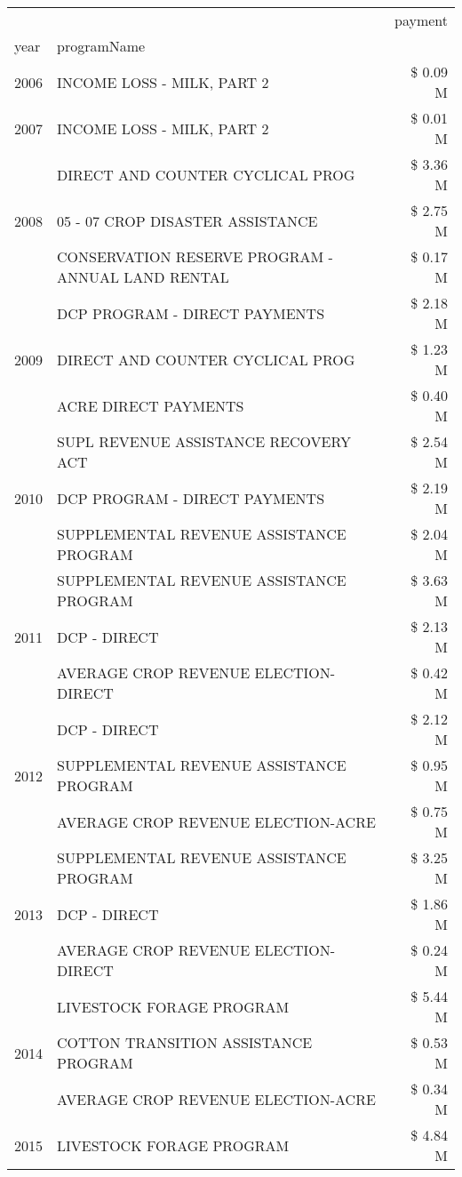 \begin{tabular}{llr}
\toprule
 &  & payment \\
year & programName &  \\
\midrule
2006 & INCOME LOSS - MILK, PART 2 & \$ 0.09 M \\
\cline{1-3}
2007 & INCOME LOSS - MILK, PART 2 & \$ 0.01 M \\
\cline{1-3}
\multirow[t]{3}{*}{2008} & DIRECT AND COUNTER CYCLICAL PROG & \$ 3.36 M \\
 & 05 - 07 CROP DISASTER ASSISTANCE & \$ 2.75 M \\
 & CONSERVATION RESERVE PROGRAM - ANNUAL LAND RENTAL & \$ 0.17 M \\
\cline{1-3}
\multirow[t]{3}{*}{2009} & DCP PROGRAM - DIRECT PAYMENTS & \$ 2.18 M \\
 & DIRECT AND COUNTER CYCLICAL PROG & \$ 1.23 M \\
 & ACRE DIRECT PAYMENTS & \$ 0.40 M \\
\cline{1-3}
\multirow[t]{3}{*}{2010} & SUPL REVENUE ASSISTANCE RECOVERY ACT & \$ 2.54 M \\
 & DCP PROGRAM - DIRECT PAYMENTS & \$ 2.19 M \\
 & SUPPLEMENTAL REVENUE ASSISTANCE PROGRAM & \$ 2.04 M \\
\cline{1-3}
\multirow[t]{3}{*}{2011} & SUPPLEMENTAL REVENUE ASSISTANCE PROGRAM & \$ 3.63 M \\
 & DCP - DIRECT & \$ 2.13 M \\
 & AVERAGE CROP REVENUE ELECTION-DIRECT & \$ 0.42 M \\
\cline{1-3}
\multirow[t]{3}{*}{2012} & DCP - DIRECT & \$ 2.12 M \\
 & SUPPLEMENTAL REVENUE ASSISTANCE PROGRAM & \$ 0.95 M \\
 & AVERAGE CROP REVENUE ELECTION-ACRE & \$ 0.75 M \\
\cline{1-3}
\multirow[t]{3}{*}{2013} & SUPPLEMENTAL REVENUE ASSISTANCE PROGRAM & \$ 3.25 M \\
 & DCP - DIRECT & \$ 1.86 M \\
 & AVERAGE CROP REVENUE ELECTION-DIRECT & \$ 0.24 M \\
\cline{1-3}
\multirow[t]{3}{*}{2014} & LIVESTOCK FORAGE PROGRAM & \$ 5.44 M \\
 & COTTON TRANSITION ASSISTANCE PROGRAM & \$ 0.53 M \\
 & AVERAGE CROP REVENUE ELECTION-ACRE & \$ 0.34 M \\
\cline{1-3}
\multirow[t]{3}{*}{2015} & LIVESTOCK FORAGE PROGRAM & \$ 4.84 M \\

\end{tabular}
